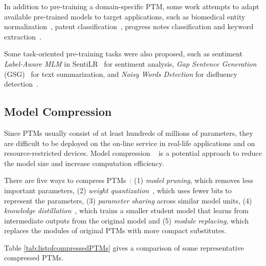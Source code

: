 \documentclass[fleqn]{SCYE-arxiv}
\begin{document}
\begin{multicols}{2}
In addition to pre-training a domain-specific PTM, some work attempts to adapt available pre-trained models to target applications, such as biomedical entity normalization~\cite{ji2019bertranking}, patent classification~\cite{lee2019patentbert}, progress notes classification and keyword extraction~\cite{tang2019progress}.

Some task-oriented pre-training tasks were also proposed, such as
sentiment \textit{Label-Aware MLM} in SentiLR~\cite{ke2019sentilr} for sentiment analysis, \textit{Gap Sentence Generation} (GSG)~\cite{zhang2019pegasus} for text summarization, and \textit{Noisy Words Detection} for disfluency detection~\cite{wang2019multi}.



\subsection{Model Compression}
\label{sec:model-compression}

Since PTMs usually consist of at least hundreds of millions of parameters, they are difficult to be deployed on the on-line service in real-life applications and on resource-restricted devices. Model compression ~\cite{bucilua2006model} is a potential approach to reduce the model size and increase computation efficiency.

There are five ways to compress PTMs~\cite{ganesh2020compressing}: (1) \textit{model pruning}, which removes less important parameters, (2) \textit{weight quantization}~\cite{dong2019hawq}, which uses
fewer bits to represent the parameters, (3) \textit{parameter sharing}
across similar model units, (4) \textit{knowledge distillation}~\cite{hinton2015distilling},
which trains a smaller student model that learns from intermediate outputs from the original model
and (5) \textit{module replacing}, which replaces the modules of original PTMs with more compact substitutes.

Table \ref{tab:listofcompressedPTMs} gives a comparison of some representative compressed PTMs.


\end{multicols}
\end{document}
